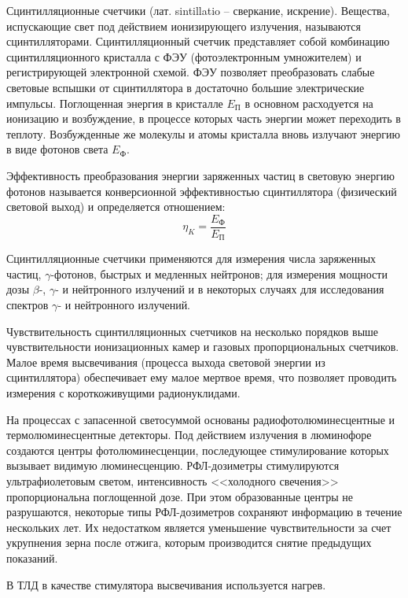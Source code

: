 \documentclass[14pt,pscyr,titlepage]{hedreport}
\begin{document}
		Сцинтилляционные счетчики (лат. sintillatio -- сверкание, искрение). 
		Вещества, испускающие свет под действием ионизирующего излучения, 
		называются сцинтилляторами. Сцинтилляционный счетчик представляет 
		собой комбинацию сцинтилляционного кристалла с ФЭУ 
		(фотоэлектронным умножителем) и регистрирующей электронной схемой. 
		ФЭУ позволяет преобразовать слабые световые вспышки от сцинтиллятора 
		в достаточно большие электрические импульсы. Поглощенная энергия в 
		кристалле \( E_\text{П} \) в основном расходуется на ионизацию и 
		возбуждение, в процессе которых часть энергии может переходить в 
		теплоту. Возбужденные же молекулы и атомы кристалла вновь излучают 
		энергию в виде фотонов света \( E_\text{Ф} \).

		Эффективность преобразования энергии заряженных частиц в световую 
		энергию фотонов называется конверсионной эффективностью сцинтиллятора 
		(физический световой выход) и определяется отношением:
		\[
			\eta_K = \frac{E_\text{Ф}}{E_\text{П}}
		\]

		Сцинтилляционные счетчики применяются для измерения числа заряженных 
		частиц, \( \gamma \)-фотонов, быстрых и медленных нейтронов; для 
		измерения мощности дозы \( \beta \)-, \( \gamma \)- и нейтронного 
		излучений и в некоторых случаях для исследования спектров 
		\( \gamma \)- и нейтронного излучений.

		Чувствительность сцинтилляционных счетчиков на несколько порядков выше 
		чувствительности ионизационных камер и газовых пропорциональных 
		счетчиков. Малое время высвечивания (процесса выхода световой энергии 
		из сцинтиллятора) обеспечивает ему малое мертвое время, что позволяет 
		проводить измерения с короткоживущими радионуклидами.

		На процессах с запасенной светосуммой основаны радиофотолюминесцентные 
		и термолюминесцентные детекторы. Под действием излучения в люминофоре 
		создаются центры фотолюминесценции, последующее стимулирование 
		которых вызывает видимую люминесценцию. РФЛ-дозиметры стимулируются 
		ультрафиолетовым светом, интенсивность <<холодного свечения>> 
		пропорциональна поглощенной дозе. При этом образованные центры не 
		разрушаются, некоторые типы РФЛ-дозиметров сохраняют информацию в 
		течение нескольких лет. Их недостатком является уменьшение 
		чувствительности за счет укрупнения зерна после отжига, которым 
		производится снятие предыдущих показаний.

		В ТЛД в качестве стимулятора высвечивания используется нагрев.
\end{document}
